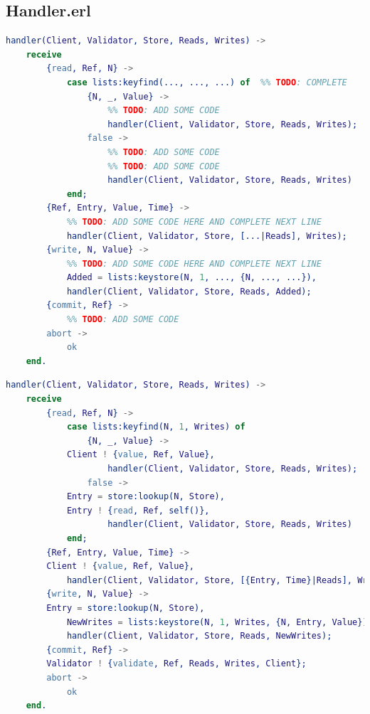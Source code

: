 \documentclass[a4paper, 10pt]{article}
\begin{document}
\subsection{Handler.erl}

  \begin{minipage}{.45\textwidth}
	\begin{lstlisting}[language=erlang, caption={Template}]
handler(Client, Validator, Store, Reads, Writes) ->         
    receive
        {read, Ref, N} ->
            case lists:keyfind(..., ..., ...) of  %% TODO: COMPLETE
                {N, _, Value} ->
                    %% TODO: ADD SOME CODE
                    handler(Client, Validator, Store, Reads, Writes);
                false ->
                    %% TODO: ADD SOME CODE
                    %% TODO: ADD SOME CODE
                    handler(Client, Validator, Store, Reads, Writes)
            end;
        {Ref, Entry, Value, Time} ->
            %% TODO: ADD SOME CODE HERE AND COMPLETE NEXT LINE
            handler(Client, Validator, Store, [...|Reads], Writes);
        {write, N, Value} ->
            %% TODO: ADD SOME CODE HERE AND COMPLETE NEXT LINE
            Added = lists:keystore(N, 1, ..., {N, ..., ...}),
            handler(Client, Validator, Store, Reads, Added);
        {commit, Ref} ->
            %% TODO: ADD SOME CODE
        abort ->
            ok
    end.
 	\end{lstlisting}
    \end{minipage}\hfill
    \begin{minipage}{.45\textwidth}
	\begin{lstlisting}[language=erlang, caption={Filled version}]
handler(Client, Validator, Store, Reads, Writes) ->         
    receive
        {read, Ref, N} ->
            case lists:keyfind(N, 1, Writes) of  
                {N, _, Value} ->
		    Client ! {value, Ref, Value},
                    handler(Client, Validator, Store, Reads, Writes);
                false ->
		    Entry = store:lookup(N, Store),
		    Entry ! {read, Ref, self()},
                    handler(Client, Validator, Store, Reads, Writes)
            end;
        {Ref, Entry, Value, Time} ->
	    Client ! {value, Ref, Value},
            handler(Client, Validator, Store, [{Entry, Time}|Reads], Writes);
        {write, N, Value} ->
	    Entry = store:lookup(N, Store),
            NewWrites = lists:keystore(N, 1, Writes, {N, Entry, Value}),
            handler(Client, Validator, Store, Reads, NewWrites);
        {commit, Ref} ->
	    Validator ! {validate, Ref, Reads, Writes, Client};
        abort ->
            ok
    end.
  	\end{lstlisting}
  \end{minipage}
\end{document}
